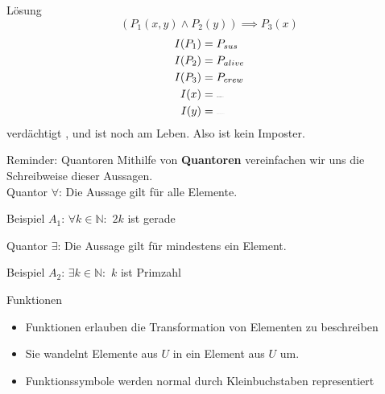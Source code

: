 {\begin{frame}{Lösung}
    $$(P_1(x,y) \wedge P_2(y)) \implies P_3(x)$$
        \begin{align*}
            I(P_1) &= P_{sus}\\
            I(P_2) &= P_{alive}\\
            I(P_3) &= P_{crew}\\
            I(x) &= \sus{white}\\
            I(y) &= \sus{magenta}
        \end{align*}
         verdächtigt , und  ist noch am Leben. Also ist  kein Imposter.
\end{frame}
}



\begin{frame}[fragile]{Reminder: Quantoren}
    Mithilfe von \textbf{Quantoren} vereinfachen wir uns die Schreibweise dieser Aussagen.\\
    \vspace{0.5cm}
    Quantor \alert{$\forall$}: Die Aussage gilt für alle Elemente.\\
    \begin{exampleblock}{Beispiel}
        $A_1$: $\forall k \in \mathbb{N}:$ $2k$ ist gerade
    \end{exampleblock}
    Quantor \alert{$\exists$}: Die Aussage gilt für mindestens ein Element.\\
    \begin{exampleblock}{Beispiel}
        $A_2$: $\exists k \in \mathbb{N}:$ $k$ ist Primzahl
    \end{exampleblock}
\end{frame}

\begin{frame}{Funktionen}
    \begin{itemize}
        \item Funktionen erlauben die \alert{Transformation von Elementen} zu beschreiben
        \item<2-> Sie wandelnt Elemente aus $U$ in ein Element aus $U$ um.
        \item<3-> Funktionssymbole werden normal durch Kleinbuchstaben representiert 
    \end{itemize}
    
\end{frame}


